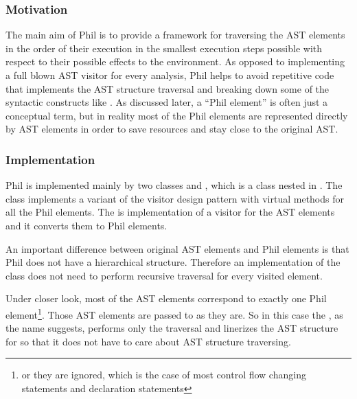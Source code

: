         \subsubsection*{Motivation}
        The main aim of Phil is to provide a framework for 
        traversing the AST elements in the order of their 
        execution in the smallest execution steps possible 
        with respect to their possible effects to the environment. 
        As opposed to implementing a full blown AST visitor 
        for every analysis, Phil helps to avoid repetitive 
        code that implements the AST structure traversal and 
        breaking down some of the syntactic constructs 
        like . As discussed later, a ``Phil element'' 
        is often just a conceptual term, but in reality most 
        of the Phil elements are represented directly by 
        AST elements in order to save resources and stay 
        close to the original AST.
        
        \subsubsection*{Implementation}
        Phil is implemented mainly by two classes  
        and , which is a class nested in . 
        The  class implements a variant of the visitor design pattern 
        with virtual  methods for all the Phil elements. 
        The  is implementation of a visitor for the 
        AST elements and it converts them to Phil elements.
        
        An important difference between original AST elements and 
        Phil elements is that Phil does not have a hierarchical structure. 
        Therefore an implementation of the  class does not 
        need to perform recursive traversal for every visited element.
        
        Under closer look, most of the AST elements correspond 
        to exactly one Phil element\footnote{or they are ignored, 
        which is the case of most control flow changing statements 
        and declaration statements}. 
        Those AST elements are passed to  as they are. 
        So in this case the , as the name suggests, 
        performs only the traversal and linerizes the AST structure 
        for  so that it does not have to 
        care about AST structure traversing.
        
